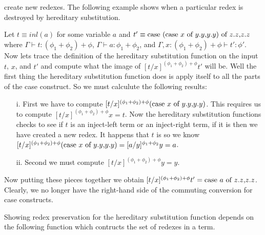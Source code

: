 create new redexes.  The following example shows when a particular redex is destroyed
by hereditary substitution.
\begin{example}
  \label{ex:commuting_conv_example_ssfp}
  Let $t \equiv inl(a)$ for some variable $a$ and $t' \equiv \mbox{case}\ (\mbox{case}\ x\ \text{of}\ y\text{.}y\text{,}y\text{.}y)\ \text{of}\ z\text{.}z\text{,}z\text{.}z$
  where $\Gamma \vdash t : (\phi_1 + \phi_2) + \phi$, $\Gamma \vdash a : \phi_1 + \phi_2$, and 
  $\Gamma, x : (\phi_1 + \phi_2) + \phi \vdash t' : \phi'$.  Now lets trace the definition of 
  the hereditary substitution function on the input $t$, $x$, and $t'$ and compute what the 
  image of $[t/x]^{(\phi_1 + \phi_2) + \phi} t'$ will be.
  Well the first thing the hereditary substitution function does is apply itself to all the 
  parts of the case construct. So we must calculute the following results:
  \begin{itemize}
  \item[i.] First we have to compute $[t/x]^{(\phi_1 + \phi_2) + \phi} (\mbox{case}\ x\ \text{of}\ y\text{.}y\text{,}y\text{.}y)$.  This 
    requires us to compute $[t/x]^{(\phi_1 + \phi_2) + \phi} x = t$.  Now the hereditary 
    substitution functions checks to see if $t$ is an inject-left term
    or an inject-right term, if it is then we have created a new redex.  It happens that 
    $t$ is so we know 
    $[t/x]^{(\phi_1 + \phi_2) + \phi} (\mbox{case}\ x\ \text{of}\ y\text{.}y\text{,}y\text{.}y) = [a/y]^{\phi_1 + \phi_2} y = a$.

  \item[ii.] Second we must compute $[t/x]^{(\phi_1 + \phi_2) + \phi} y = y$.
  \end{itemize}
  Now putting these pieces together we obtain 
  $[t/x]^{(\phi_1 + \phi_2) + \phi} t' = \mbox{case}\ a\ \text{of}\ z\text{.}z\text{,}z\text{.}z$.  Clearly,
  we no longer have the right-hand side of the commuting conversion for case constructs.
\end{example}
Showing redex preservation for the hereditary substitution function
depends on the following function which contructs the set of redexes
in a term.
